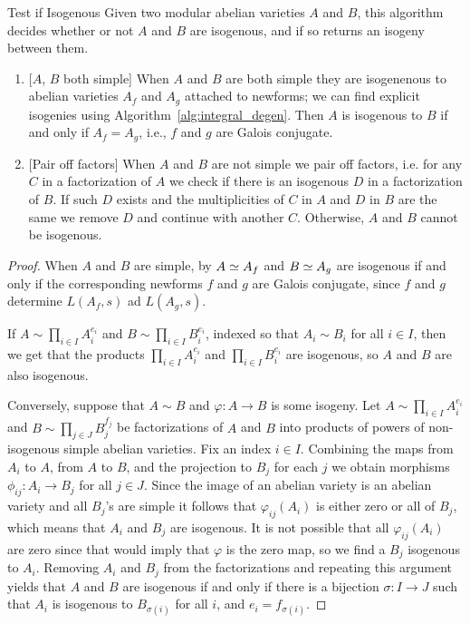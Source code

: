 \documentclass{article}
\begin{document}
\begin{algorithm}{Test if Isogenous}
    Given two modular abelian varieties $A$ and $B$, this
    algorithm decides whether or not $A$ and $B$ are isogenous, and if
    so returns an isogeny between them.

    \begin{enumerate}
        \item{} [$A$, $B$ both simple] When $A$ and $B$ are both simple they
            are isogenenous to abelian varieties $A_f$ and $A_g$ attached to
            newforms; we can find explicit isogenies using
            Algorithm~\ref{alg:integral_degen}.
            Then $A$ is isogenous to $B$ if and only if $A_f = A_g$, i.e., $f$
            and $g$ are Galois conjugate.


        \item{} [Pair off factors] When $A$ and $B$ are not simple we pair off
            factors, i.e. for any $C$ in a factorization of $A$ we check if
            there is an isogenous $D$ in a factorization of $B$. If such $D$
            exists and the multiplicities of $C$ in $ A$ and $D$ in $B$ are the
            same we remove $D$ and continue with another $C$. Otherwise, $A$ and
            $B$ cannot be isogenous.
    \end{enumerate}
\end{algorithm}
\begin{proof}
    When $A$ and $B$ are simple, by \cite[\S5]{faltings:finiteness}
    $A\simeq A_f$ and $B\simeq A_g$ are isogenous if and only if the
    corresponding newforms $f$ and $g$ are Galois conjugate,
    since $f$ and $g$ determine $L(A_f,s)$ ad $L(A_g,s)$.

    If $A \sim \prod_{i \in I} A_i^{e_i}$ and $B \sim \prod_{i \in I}
    B_i^{e_i}$, indexed so that $A_i \sim B_i$ for all $i \in I$, then we
    get that the products $\prod_{i \in I} A_i^{e_i}$ and $\prod_{i \in I}
    B_i^{e_i}$ are isogenous, so $A$ and $B$ are also isogenous.

    Conversely, suppose that $A \sim B$ and $\varphi: A \to B$ is some
    isogeny.  Let $A \sim \prod_{i \in I} A_i^{e_i}$ and $B \sim
    \prod_{j \in J} B_j^{f_j}$ be factorizations of $A$ and $B$ into
    products of powers of non-isogenous simple abelian varieties. Fix an
    index $i \in I$.  Combining the maps from $A_i$ to $A$, from $A$ to
    $B$, and the projection to $B_j$ for each $j$ we obtain morphisms
    $\phi_{ij}: A_i \to B_j$ for all $j \in J$. Since the image of an
    abelian variety is an abelian variety and all $B_j$'s are simple it
    follows that $\varphi_{ij}(A_i)$ is either zero or all of $B_j$,
    which means that $A_i$ and $B_j$ are isogenous. It is not possible
    that all $\varphi_{ij}(A_i)$ are zero since that would imply that
    $\varphi$ is the zero map, so we find a $B_j$ isogenous to
    $A_i$. Removing $A_i$ and $B_j$ from the factorizations and
    repeating this argument yields that $A$ and $B$ are isogenous if and
    only if there is a bijection $\sigma:I\to J$ such that $A_i$ is
    isogenous to $B_{\sigma(i)}$ for all $i$, and $e_i = f_{\sigma(i)}$.
\end{proof}
\end{document}
